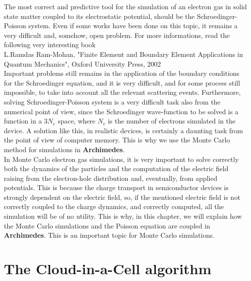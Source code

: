 \documentclass[12pt]{book}
\begin{document}
The most correct and predictive tool for the simulation of an electron gas in solid state matter coupled to its electrostatic potential, should be the Schroedinger-Poisson system. Even if some works have been done on this topic, it remains a very difficult and, somehow, open problem. For more informations, read the following very interesting book
\\
L.Ramdas Ram-Mohan, "Finite Element and Boundary Element Applications in Quantum Mechanics", Oxford University Press, 2002
\\
 Important problems still remains in the application of the boundary conditions for the Schroedinger equation, and it is very difficult, and for some process still impossible, to take into account all the relevant scattering events. Furthermore, solving Schroedinger-Poisson system is a very difficult task also from the numerical point of view, since the Schroedinger wave-function to be solved is a function in a $3 N_e$ space, where $N_e$ is the number of electrons simulated in the device. A solution like this, in realistic devices, is certainly a daunting task from the point of view of computer memory. This is why we use the Monte Carlo method for simulations in \textbf{Archimedes}.
\\
In Monte Carlo electron gas simulations, it is very important to solve correctly both the dynamics of the particles and the computation of the electric field raising from the electron-hole distribution and, eventually, from applied potentials. This is because the charge transport in semiconductor devices is strongly dependent on the electric field, so, if the mentioned electric field is not correctly coupled to the charge dynamics, and correctly computed, all the simulation will be of no utility. This is why, in this chapter, we will explain how the Monte Carlo simulations and the Poisson equation are coupled in \textbf{Archimedes}. This is an important topic for Monte Carlo simulations.

\section{The Cloud-in-a-Cell algorithm}
\end{document}
